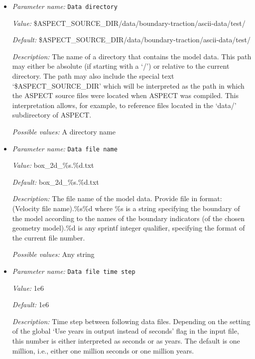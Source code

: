 \begin{itemize}
\item {\it Parameter name:} {\tt Data directory}
\label{parameters:Boundary traction model/Ascii data model/Data directory}


{\it Value:} \$ASPECT\_SOURCE\_DIR/data/boundary-traction/ascii-data/test/


{\it Default:} \$ASPECT\_SOURCE\_DIR/data/boundary-traction/ascii-data/test/


{\it Description:} The name of a directory that contains the model data. This path may either be absolute (if starting with a `/') or relative to the current directory. The path may also include the special text `\$ASPECT\_SOURCE\_DIR' which will be interpreted as the path in which the ASPECT source files were located when ASPECT was compiled. This interpretation allows, for example, to reference files located in the `data/' subdirectory of ASPECT. 


{\it Possible values:} A directory name
\item {\it Parameter name:} {\tt Data file name}
\label{parameters:Boundary traction model/Ascii data model/Data file name}


{\it Value:} box\_2d\_\%s.\%d.txt


{\it Default:} box\_2d\_\%s.\%d.txt


{\it Description:} The file name of the model data. Provide file in format: (Velocity file name).\%s\%d where \%s is a string specifying the boundary of the model according to the names of the boundary indicators (of the chosen geometry model).\%d is any sprintf integer qualifier, specifying the format of the current file number. 


{\it Possible values:} Any string
\item {\it Parameter name:} {\tt Data file time step}
\label{parameters:Boundary traction model/Ascii data model/Data file time step}


{\it Value:} 1e6


{\it Default:} 1e6


{\it Description:} Time step between following data files. Depending on the setting of the global `Use years in output instead of seconds' flag in the input file, this number is either interpreted as seconds or as years. The default is one million, i.e., either one million seconds or one million years.



\end{itemize}
